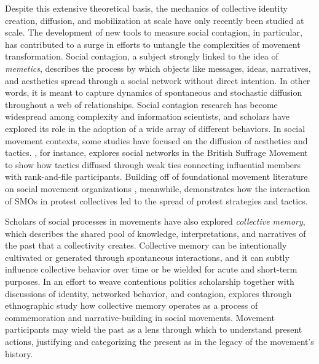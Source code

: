 \documentclass[12pt]{article}
\begin{document}
Despite this extensive theoretical basis, the mechanics of collective identity creation, diffusion, and mobilization at scale have only recently been studied at scale. The development of new tools to measure social contagion, in particular, has contributed to a surge in efforts to untangle the complexities of movement transformation. Social contagion, a subject strongly linked to the idea of \textit{memetics}, describes the process by which objects like messages, ideas, narratives, and aesthetics spread through a social network without direct intention. In other words, it is meant to capture dynamics of spontaneous and stochastic diffusion throughout a web of relationships. Social contagion research has become widespread among complexity and information scientists, and scholars have explored its role in the adoption of a wide array of different behaviors. In social movement contexts, some studies have focused on the diffusion of aesthetics and tactics. \textcite{edwards2016infectious}, for instance, explores social networks in the British Suffrage Movement to show how tactics diffused through weak ties connecting influential members with rank-and-file participants. Building off of foundational movement literature on social movement organizations \parencite{zald1966social}, meanwhile, \textcite{wang2012social} demonstrates how the interaction of SMOs in protest collectives led to the spread of protest strategies and tactics.

Scholars of social processes in movements have also explored \textit{collective memory}, which describes the shared pool of knowledge, interpretations, and narratives of the past that a collectivity creates. Collective memory can be intentionally cultivated or generated through spontaneous interactions, and it can subtly influence collective behavior over time or be wielded for acute and short-term purposes. In an effort to weave contentious politics scholarship together with discussions of identity, networked behavior, and contagion, \textcite{gongaware2010collective} explores through ethnographic study how collective memory operates as a process of commemoration and narrative-building in social movements. Movement participants may wield the past as a lens through which to understand present actions, justifying and categorizing the present as in the legacy of the movement's history.
\end{document}
